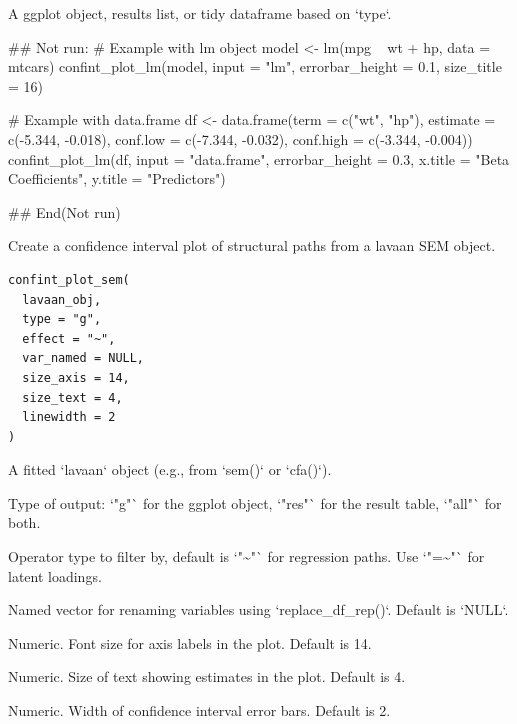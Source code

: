 \documentclass[a4paper]{book}
\begin{document}
%
\begin{Value}
A ggplot object, results list, or tidy dataframe based on `type`.
\end{Value}
%
\begin{Examples}
\begin{ExampleCode}
## Not run: 
# Example with lm object
model <- lm(mpg ~ wt + hp, data = mtcars)
confint_plot_lm(model, input = "lm", errorbar_height = 0.1, size_title = 16)

# Example with data.frame
df <- data.frame(term = c("wt", "hp"), estimate = c(-5.344, -0.018),
                 conf.low = c(-7.344, -0.032), conf.high = c(-3.344, -0.004))
confint_plot_lm(df, input = "data.frame", errorbar_height = 0.3,
                x.title = "Beta Coefficients", y.title = "Predictors")

## End(Not run)
\end{ExampleCode}
\end{Examples}
%
\begin{Description}
Create a confidence interval plot of structural paths from a lavaan SEM object.
\end{Description}
%
\begin{Usage}
\begin{verbatim}
confint_plot_sem(
  lavaan_obj,
  type = "g",
  effect = "~",
  var_named = NULL,
  size_axis = 14,
  size_text = 4,
  linewidth = 2
)
\end{verbatim}
\end{Usage}
%
\begin{Arguments}
\begin{ldescription}
\item[\code{lavaan\_obj}] A fitted `lavaan` object (e.g., from `sem()` or `cfa()`).

\item[\code{type}] Type of output: `"g"` for the ggplot object, `"res"` for the result table, `"all"` for both.

\item[\code{effect}] Operator type to filter by, default is `"\textasciitilde{}"` for regression paths. Use `"=\textasciitilde{}"` for latent loadings.

\item[\code{var\_named}] Named vector for renaming variables using `replace\_df\_rep()`. Default is `NULL`.

\item[\code{size\_axis}] Numeric. Font size for axis labels in the plot. Default is 14.

\item[\code{size\_text}] Numeric. Size of text showing estimates in the plot. Default is 4.

\item[\code{linewidth}] Numeric. Width of confidence interval error bars. Default is 2.
\end{ldescription}
\end{Arguments}
\end{document}
